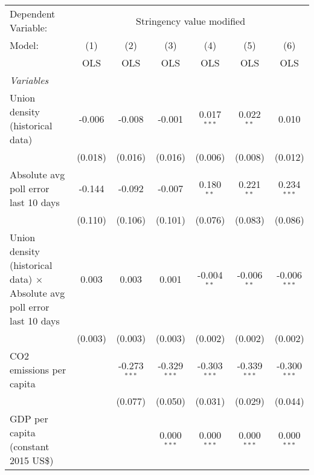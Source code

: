 
\begingroup
\centering
\begin{tabular}{lcccccc}
   \toprule
   Dependent Variable: & \multicolumn{6}{c}{Stringency value modified}\\
   Model:                                                                         & (1)     & (2)            & (3)            & (4)            & (5)            & (6)\\  
                                                                                  &  OLS    & OLS            & OLS            & OLS            & OLS            & OLS\\  
   \midrule
   \emph{Variables}\\
   Union density (historical data)                                                & -0.006  & -0.008         & -0.001         & 0.017$^{***}$  & 0.022$^{**}$   & 0.010\\   
                                                                                  & (0.018) & (0.016)        & (0.016)        & (0.006)        & (0.008)        & (0.012)\\   
   Absolute avg poll error last 10 days                                           & -0.144  & -0.092         & -0.007         & 0.180$^{**}$   & 0.221$^{**}$   & 0.234$^{***}$\\   
                                                                                  & (0.110) & (0.106)        & (0.101)        & (0.076)        & (0.083)        & (0.086)\\   
   Union density (historical data) $\times$ Absolute avg poll error last 10 days  & 0.003   & 0.003          & 0.001          & -0.004$^{**}$  & -0.006$^{**}$  & -0.006$^{***}$\\   
                                                                                  & (0.003) & (0.003)        & (0.003)        & (0.002)        & (0.002)        & (0.002)\\   
   CO2 emissions per capita                                                       &         & -0.273$^{***}$ & -0.329$^{***}$ & -0.303$^{***}$ & -0.339$^{***}$ & -0.300$^{***}$\\   
                                                                                  &         & (0.077)        & (0.050)        & (0.031)        & (0.029)        & (0.044)\\   
   GDP per capita (constant 2015 US\$)                                            &         &                & 0.000$^{***}$  & 0.000$^{***}$  & 0.000$^{***}$  & 0.000$^{***}$\\   

\end{tabular}
